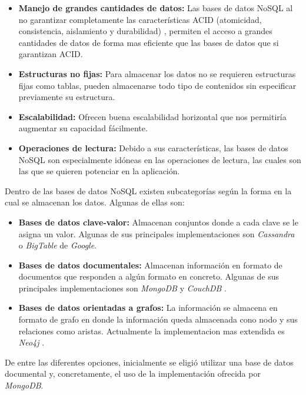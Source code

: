 \documentclass[11pt,a4paper]{article}
\begin{document}
\begin{itemize}
\item \textbf{Manejo de grandes cantidades de datos:} Las bases de datos NoSQL al no garantizar completamente las características ACID (atomicidad, consistencia, aislamiento y durabilidad) \cite{33}, permiten el acceso a grandes cantidades de datos de forma mas eficiente que las bases de datos que si garantizan ACID.
\item \textbf{Estructuras no fijas:} Para almacenar los datos no se requieren estructuras fijas como tablas, pueden almacenarse todo tipo de contenidos sin especificar previamente su estructura.
\item \textbf{Escalabilidad:} Ofrecen buena escalabilidad horizontal que nos permitiría augmentar su capacidad fácilmente.
\item \textbf{Operaciones de lectura:} Debido a sus características, las bases de datos NoSQL son especialmente idóneas en las operaciones de lectura, las cuales son las que se quieren potenciar en la aplicación.
\end{itemize}

Dentro de las bases de datos NoSQL existen subcategorías según la forma en la cual se almacenan los datos. Algunas de ellas son:
\begin{itemize}
\item \textbf{Bases de datos clave-valor:} Almacenan conjuntos donde a cada clave se le asigna un valor. Algunas de sus principales implementaciones son \textit{Cassandra} \cite{34} o \textit{BigTable} de \textit{Google}. 
\item \textbf{Bases de datos documentales:} Almacenan información en formato de documentos que responden a algún formato en concreto. Algunas de sus principales implementaciones son \textit{MongoDB} \cite{35} y \textit{CouchDB} \cite{36}.
\item \textbf{Bases de datos orientadas a grafos:} La información se almacena en formato de grafo en donde la información queda almacenada cono nodo y sus relaciones como aristas. Actualmente la implementacion mas extendida es \textit{Neo4j} \cite{37}.
\end{itemize}

De entre las diferentes opciones, inicialmente se eligió utilizar una base de datos documental y, concretamente, el uso de la implementación ofrecida por \textit{MongoDB}.
\\
\end{document}
